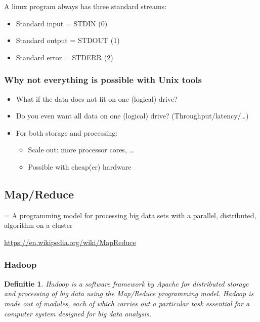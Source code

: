 \documentclass{article}
\newtheorem{theorem}{Definitie}[section]
\begin{document}
A linux program always has three standard streams:

\begin{itemize}
    \item Standard input = STDIN (0)
    \item Standard output = STDOUT (1)
    \item Standard error = STDERR (2)
\end{itemize}

\subsubsection{Why not everything is possible with Unix tools}

\begin{itemize}
    \item What if the data does not fit on one (logical) drive?
    \item Do you even want all data on one (logical) drive? (Throughput/latency/\dots)
    \item For both storage and processing:
    \begin{itemize}
        \item Scale out: more processor cores, \dots
        \item Possible with cheap(er) hardware
    \end{itemize}
\end{itemize}

\subsection{Map/Reduce}

= A programming model for processing big data sets with a parallel, distributed, algorithm on a cluster

\url{https://en.wikipedia.org/wiki/MapReduce}


\subsubsection{Hadoop}

\begin{theorem}
    Hadoop is a software framework by Apache for distributed storage and processing of big data using the Map/Reduce programming model. 
    Hadoop is made out of modules, each of which carries out a particular task essential for a computer system designed for big data analysis.
\end{theorem}
\end{document}
